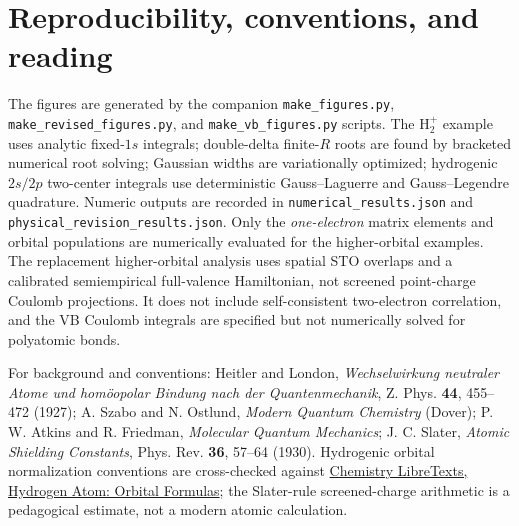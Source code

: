 \documentclass[11pt,letterpaper]{article}
\begin{document}
\section{Reproducibility, conventions, and reading}
The figures are generated by the companion \texttt{make\_figures.py}, \texttt{make\_revised\_figures.py}, and \texttt{make\_vb\_figures.py} scripts. The $\mathrm H_2^+$ example uses analytic fixed-$1s$ integrals; double-delta finite-$R$ roots are found by bracketed numerical root solving; Gaussian widths are variationally optimized; hydrogenic $2s/2p$ two-center integrals use deterministic Gauss--Laguerre and Gauss--Legendre quadrature. Numeric outputs are recorded in \texttt{numerical\_results.json} and \texttt{physical\_revision\_results.json}. Only the \emph{one-electron} matrix elements and orbital populations are numerically evaluated for the higher-orbital examples. The replacement higher-orbital analysis uses spatial STO overlaps and a calibrated semiempirical full-valence Hamiltonian, not screened point-charge Coulomb projections. It does not include self-consistent two-electron correlation, and the VB Coulomb integrals are specified but not numerically solved for polyatomic bonds.

For background and conventions: Heitler and London, \emph{Wechselwirkung neutraler Atome und hom\"oopolar Bindung nach der Quantenmechanik}, Z. Phys. \textbf{44}, 455--472 (1927); A. Szabo and N. Ostlund, \emph{Modern Quantum Chemistry} (Dover); P. W. Atkins and R. Friedman, \emph{Molecular Quantum Mechanics}; J. C. Slater, \emph{Atomic Shielding Constants}, Phys. Rev. \textbf{36}, 57--64 (1930). Hydrogenic orbital normalization conventions are cross-checked against \href{https://chem.libretexts.org/Bookshelves/Physical_and_Theoretical_Chemistry_Textbook_Maps/Supplemental_Modules_(Physical_and_Theoretical_Chemistry)/Quantum_Mechanics/09._The_Hydrogen_Atom/Chapter_7.__The_Hydrogen_Atom}{Chemistry LibreTexts, Hydrogen Atom: Orbital Formulas}; the Slater-rule screened-charge arithmetic is a pedagogical estimate, not a modern atomic calculation.
\end{document}
